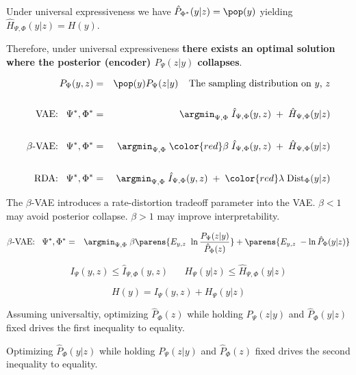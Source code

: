 {\vfill
Under universal expressiveness we have $\hat{P}_{\Phi^*}(y|z) = \pop(y)$ yielding {\color{red} $\hat{H}_{\Psi,\Phi}(y|z) = H(y)$}.

\vfill
Therefore, under universal expressiveness {\bf there exists an optimal solution where
the posterior (encoder) $P_\Psi(z|y)$ collapses}.


{\huge
\begin{eqnarray*}
P_\Psi(y,z) & = & \pop(y)P_\Psi(z|y)\;\;\;\;\mbox{The sampling distribution on $y$, $z$} \\
\\
\mbox{VAE:}\;\;\;\Psi^*,\Phi^*  & = & \argmin_{\Psi,\Phi}\; \hat{I}_{\Psi,\Phi}(y,z) \;+\; \hat{H}_{\Psi,\Phi}(y|z) \\
\\
\mbox{$\beta$-VAE:}\;\;\; \Psi^*,\Phi^* & = & \argmin_{\Psi,\Phi}\; {\color{red} \beta}\; \hat{I}_{\Psi,\Phi}(y,z) \;+\; \hat{H}_{\Psi,\Phi}(y|z) \\
\\
\mbox{RDA:}\;\;\;\Psi^*,\Phi^*  & = &  \argmin_{\Psi,\Phi}\;  \hat{I}_{\Psi,\Phi}(y,z) \;+\; {\color{red} \lambda}\;\mathrm{Dist}_\Phi(y|z)
\end{eqnarray*}
}

The $\beta$-VAE introduces a rate-distortion tradeoff parameter into the VAE.  $\beta < 1$ may avoid posterior collapse.  $\beta > 1$ may improve interpretability.


{\huge
\begin{eqnarray*}
\mbox{$\beta$-VAE:}\;\;\;\Psi^*,\Phi^*  & = & \argmin_{\Psi,\Phi}\; \beta\parens{E_{y,z} \;\;{\ln \frac{P_\Psi(z|y)}{\hat{P}_\Phi(z)}}}  + \parens{E_{y,z}\;-\ln {\hat{P}_\Phi(y|z)}}
\end{eqnarray*}


{\color{red}
$$I_\Psi(y,z) \leq \hat{I}_{\Psi,\Phi}(y,z) \;\;\;\;\;\; H_\Psi(y|z) \leq \hat{H}_{\Psi,\Phi}(y|z)$$

$$H(y) = I_\Psi(y,z) + H_\Psi(y|z)$$}
}

Assuming universaltiy, optimizing $\hat{P}_\Phi(z)$ while holding $P_\Psi(z|y)$ and $\hat{P}_\Phi(y|z)$ fixed drives the first inequality to equality.

\vfill
Optimizing $\hat{P}_\Phi(y|z)$ while holding $P_\Psi(z|y)$ and $\hat{P}_\Phi(z)$ fixed drives the second inequality to equality.


}
